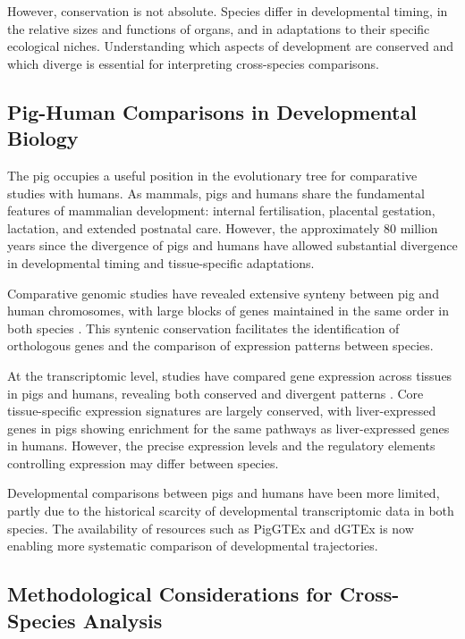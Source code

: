 However, conservation is not absolute. Species differ in developmental timing, in the relative sizes and functions of organs, and in adaptations to their specific ecological niches. Understanding which aspects of development are conserved and which diverge is essential for interpreting cross-species comparisons.

\subsection{Pig-Human Comparisons in Developmental Biology}

The pig occupies a useful position in the evolutionary tree for comparative studies with humans. As mammals, pigs and humans share the fundamental features of mammalian development: internal fertilisation, placental gestation, lactation, and extended postnatal care. However, the approximately 80 million years since the divergence of pigs and humans \parencite{kumar_timetree_2022} have allowed substantial divergence in developmental timing and tissue-specific adaptations.

Comparative genomic studies have revealed extensive synteny between pig and human chromosomes, with large blocks of genes maintained in the same order in both species \parencite{groenen_analyses_2012}. This syntenic conservation facilitates the identification of orthologous genes and the comparison of expression patterns between species.

At the transcriptomic level, studies have compared gene expression across tissues in pigs and humans, revealing both conserved and divergent patterns \parencite{teng_compendium_2024, cardoso-moreira_gene_2019}. Core tissue-specific expression signatures are largely conserved, with liver-expressed genes in pigs showing enrichment for the same pathways as liver-expressed genes in humans. However, the precise expression levels and the regulatory elements controlling expression may differ between species.

Developmental comparisons between pigs and humans have been more limited, partly due to the historical scarcity of developmental transcriptomic data in both species. The availability of resources such as PigGTEx and dGTEx is now enabling more systematic comparison of developmental trajectories.

\subsection{Methodological Considerations for Cross-Species Analysis}

